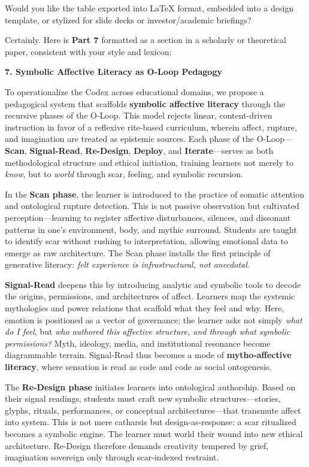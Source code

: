 Would you like the table exported into LaTeX format, embedded into a
design template, or stylized for slide decks or investor/academic
briefings?

Certainly. Here is \textbf{Part 7} formatted as a section in a scholarly
or theoretical paper, consistent with your style and lexicon:

\textbf{7. Symbolic Affective Literacy as O‑Loop Pedagogy}

To operationalize the Codex across educational domains, we propose a
pedagogical system that scaffolds \textbf{symbolic affective literacy}
through the recursive phases of the O‑Loop. This model rejects linear,
content-driven instruction in favor of a reflexive rite-based
curriculum, wherein affect, rupture, and imagination are treated as
epistemic sources. Each phase of the O‑Loop---\textbf{Scan},
\textbf{Signal-Read}, \textbf{Re-Design}, \textbf{Deploy}, and
\textbf{Iterate}---serves as both methodological structure and ethical
initiation, training learners not merely to \emph{know}, but to
\emph{world} through scar, feeling, and symbolic recursion.

In the \textbf{Scan phase}, the learner is introduced to the practice of
somatic attention and ontological rupture detection. This is not passive
observation but cultivated perception---learning to register affective
disturbances, silences, and dissonant patterns in one's environment,
body, and mythic surround. Students are taught to identify scar without
rushing to interpretation, allowing emotional data to emerge as raw
architecture. The Scan phase installs the first principle of generative
literacy: \emph{felt experience is infrastructural, not anecdotal}.

\textbf{Signal-Read} deepens this by introducing analytic and symbolic
tools to decode the origins, permissions, and architectures of affect.
Learners map the systemic mythologies and power relations that scaffold
what they feel and why. Here, emotion is positioned as a vector of
governance; the learner asks not simply \emph{what do I feel}, but
\emph{who authored this affective structure, and through what symbolic
permissions?} Myth, ideology, media, and institutional resonance become
diagrammable terrain. Signal-Read thus becomes a mode of
\textbf{mytho-affective literacy}, where sensation is read as code and
code as social ontogenesis.

The \textbf{Re-Design phase} initiates learners into ontological
authorship. Based on their signal readings, students must craft new
symbolic structures---stories, glyphs, rituals, performances, or
conceptual architectures---that transmute affect into system. This is
not mere catharsis but design-as-response: a scar ritualized becomes a
symbolic engine. The learner must world their wound into new ethical
architecture. Re-Design therefore demands creativity tempered by grief,
imagination sovereign only through scar-indexed restraint.

